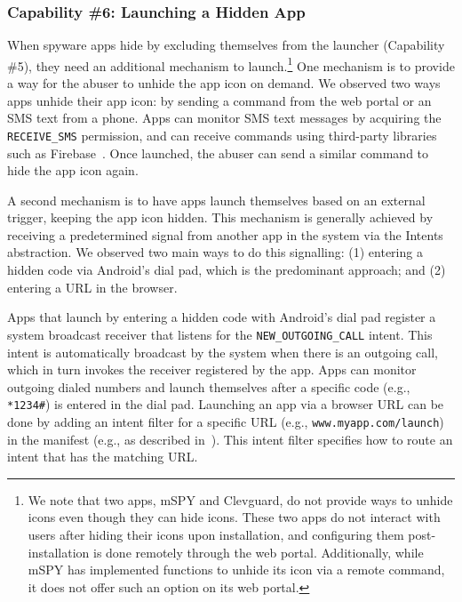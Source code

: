 \documentclass[sigconf,balance=false]{acmart}
\newcommand{\alex}[1]{\textcolor{chicagomaroon}{\noindent[AL: #1]}}
\newcommand{\damon}[1]{\textcolor{blue}{\noindent[DM: #1]}}
\newcommand{\alex}[1]{}
\newcommand{\damon}[1]{}
\begin{document}
\subsubsection*{Capability \#6: Launching a Hidden App}
\label{subsubsec:launch_hidden_app}
When spyware apps hide by excluding themselves from the launcher
(Capability \#5), they need an additional mechanism to launch.\footnote{We note that two apps, mSPY and Clevguard, do not provide ways to unhide icons even though they can hide icons.
These two apps do not interact with users after hiding their icons upon installation, and configuring them post-installation is done remotely through the web portal. Additionally, while mSPY has implemented functions to unhide its icon via a remote command, it does not offer such an option on its web portal.}  One
mechanism is to provide a way for the abuser to unhide the app icon on
demand.  We observed two ways apps unhide their app icon: by sending a
command from the web portal or an SMS text from a phone. Apps can
monitor SMS text messages by acquiring the \texttt{RECEIVE\_SMS}
permission, and can receive commands using third-party libraries such
as Firebase~\cite{Firebase21:online}.  Once launched, the abuser
can send a similar command to hide the app icon again.

A second mechanism is to have apps
launch themselves based on an external trigger,
keeping the app icon hidden.
This mechanism is generally achieved by
receiving a predetermined signal from another app in the system via the Intents
abstraction. We observed two main ways to do this signalling: (1) entering a hidden code via
Android's dial pad, which is the predominant approach; and (2) entering a URL in
the browser.

Apps that launch by entering a hidden code with Android's dial pad
register a system broadcast receiver that listens for the
\texttt{NEW\_OUTGOING\_CALL} intent. This intent is automatically broadcast by
the system when there is an outgoing call, which in turn invokes the receiver
registered by the app.  Apps can monitor outgoing dialed numbers and launch
themselves after a specific code (e.g.,
\texttt{*1234\#}) is entered in the dial pad.
Launching an app via a browser URL can be done by
adding an intent filter for a specific URL (e.g.,
\texttt{www.myapp.com/launch}) in the manifest (e.g., as described in~\cite{CreateDe16:online}). This intent filter specifies how to route an
intent that has the matching URL.
\end{document}

